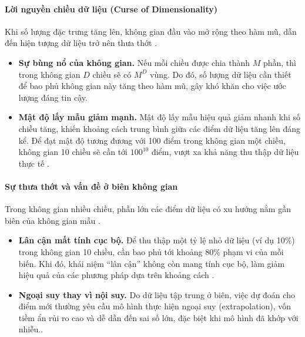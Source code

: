 \paragraph{Lời nguyền chiều dữ liệu (Curse of Dimensionality)}

Khi số lượng đặc trưng tăng lên, không gian đầu vào mở rộng theo hàm mũ, dẫn đến hiện tượng dữ liệu trở nên thưa thớt \cite[pp.~33-38]{Bishop2006}. 

\begin{itemize}
    \item \textbf{Sự bùng nổ của không gian.} Nếu mỗi chiều được chia thành $M$ phần, thì trong không gian $D$ chiều sẽ có $M^D$ vùng. Do đó, số lượng dữ liệu cần thiết để bao phủ không gian này tăng theo hàm mũ, gây khó khăn cho việc ước lượng đáng tin cậy.
    
    \item \textbf{Mật độ lấy mẫu giảm mạnh.} Mật độ lấy mẫu hiệu quả giảm nhanh khi số chiều tăng, khiến khoảng cách trung bình giữa các điểm dữ liệu tăng lên đáng kể. Để đạt mật độ tương đương với 100 điểm trong không gian một chiều, không gian 10 chiều sẽ cần tới $100^{10}$ điểm, vượt xa khả năng thu thập dữ liệu thực tế \cite[p.~23]{Hastie2009}.
\end{itemize}

\paragraph{Sự thưa thớt và vấn đề ở biên không gian}

Trong không gian nhiều chiều, phần lớn các điểm dữ liệu có xu hướng nằm gần biên của không gian mẫu \cite[p.~23]{Hastie2009}.

\begin{itemize}
    \item \textbf{Lân cận mất tính cục bộ.} Để thu thập một tỷ lệ nhỏ dữ liệu (ví dụ 10\%) trong không gian 10 chiều, cần bao phủ tới khoảng 80\% phạm vi của mỗi biến. Khi đó, khái niệm ``lân cận'' không còn mang tính cục bộ, làm giảm hiệu quả của các phương pháp dựa trên khoảng cách \cite[p.~22]{Hastie2009}.
    
    \item \textbf{Ngoại suy thay vì nội suy.} Do dữ liệu tập trung ở biên, việc dự đoán cho điểm mới thường yêu cầu mô hình thực hiện ngoại suy (extrapolation), vốn tiềm ẩn rủi ro cao và dễ dẫn đến sai số lớn, đặc biệt khi mô hình đã khớp với nhiễu\cite[p.~23]{Hastie2009}..
\end{itemize}


